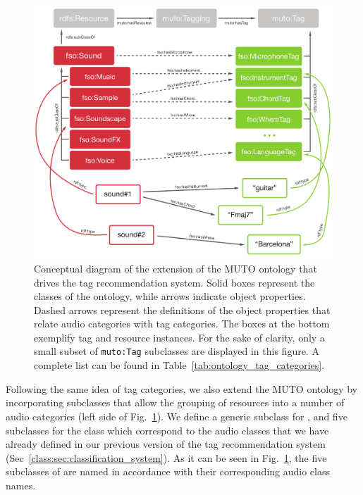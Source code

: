 \begin{figure}[t]
  \centering
  \includegraphics[width=1.0\textwidth]{ch06_ontology/pics/diagram_ontology_model}
  \caption[Conceptual diagram of the extension of the MUTO ontology]{Conceptual diagram of the extension of the MUTO ontology that drives the tag recommendation system. Solid boxes represent the classes of the ontology, while arrows indicate object properties. Dashed arrows represent the definitions of the object properties that relate audio categories with tag categories. The boxes at the bottom exemplify tag and resource instances. For the sake of clarity, only a small subset of \texttt{muto:Tag} subclasses are displayed in this figure. A complete list can be found in Table~\ref{tab:ontology_tag_categories}.}
  \label{fig:ontology_concept}
\end{figure}


Following the same idea of tag categories, we also extend the MUTO ontology by incorporating  subclasses that allow the grouping of resources into a number of audio categories (left side of Fig.~\ref{fig:ontology_concept}). 
We define a generic  subclass for , and five subclasses for the  class which correspond to the audio classes that we have already defined in our previous version of the tag recommendation system (Sec~\ref{class:sec:classification_system}). 
As it can be seen in Fig.~\ref{fig:ontology_concept}, the five subclasses of  are named in accordance with their corresponding audio class names.%

